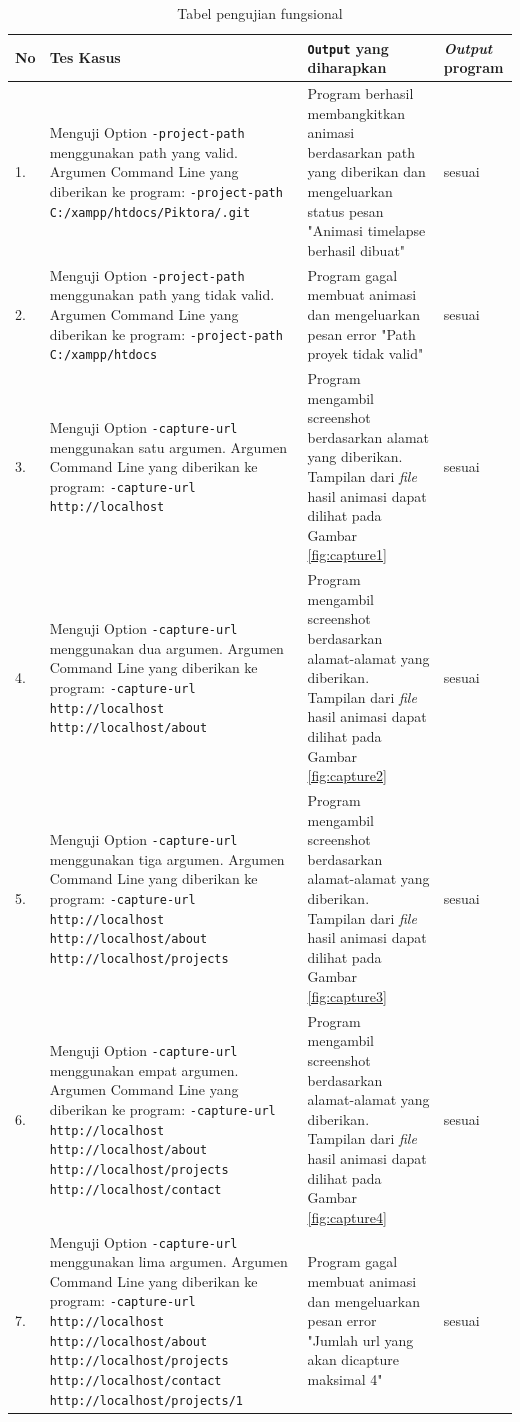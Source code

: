 \begin{table}[htbp]
	\centering
	\caption{Tabel pengujian fungsional}
	
		\begin{tabular}{|p{0.3cm}|>{\raggedright} p{5.5 cm}| p{7 cm}| p{3 cm}|} \hline
		No & Tes Kasus	& \texttt{Output} yang diharapkan & \textit{Output} program \\ \hline
		1. & Menguji Option \texttt{-project-path} menggunakan path yang valid. Argumen Command Line yang diberikan ke program: \texttt{-project-path C:/xampp/htdocs/Piktora/.git} & Program berhasil membangkitkan animasi berdasarkan path yang diberikan dan mengeluarkan status pesan "Animasi timelapse berhasil dibuat" & sesuai \\ \hline
		2. & Menguji Option \texttt{-project-path} menggunakan path yang tidak valid. Argumen Command Line yang diberikan ke program: \texttt{-project-path C:/xampp/htdocs}  & Program gagal membuat animasi dan mengeluarkan pesan error "Path proyek tidak valid"  & sesuai \\ \hline
		3. & Menguji Option \texttt{-capture-url} menggunakan satu argumen. Argumen Command Line yang diberikan ke program:  \texttt{-capture-url http://localhost} & Program mengambil screenshot berdasarkan alamat yang diberikan. Tampilan dari \textit{file} hasil animasi dapat dilihat pada Gambar \ref{fig:capture1}  & sesuai	\\ \hline
		4. & Menguji Option \texttt{-capture-url} menggunakan dua argumen. Argumen Command Line yang diberikan ke program:  \texttt{-capture-url http://localhost http://localhost/about} & Program mengambil screenshot berdasarkan alamat-alamat yang diberikan. Tampilan dari \textit{file} hasil animasi dapat dilihat pada Gambar \ref{fig:capture2}  & sesuai \\ \hline
		5. & Menguji Option \texttt{-capture-url} menggunakan tiga argumen. Argumen Command Line yang diberikan ke program:  \texttt{-capture-url http://localhost http://localhost/about http://localhost/projects} & Program mengambil screenshot berdasarkan alamat-alamat yang diberikan. Tampilan dari \textit{file} hasil animasi dapat dilihat pada Gambar \ref{fig:capture3}   & sesuai\\ \hline
		6. & Menguji Option \texttt{-capture-url} menggunakan empat argumen. Argumen Command Line yang diberikan ke program:  \texttt{-capture-url http://localhost http://localhost/about http://localhost/projects http://localhost/contact} & Program mengambil screenshot berdasarkan alamat-alamat yang diberikan. Tampilan dari \textit{file} hasil animasi dapat dilihat pada Gambar \ref{fig:capture4}  & sesuai \\ \hline
		7. & Menguji Option \texttt{-capture-url} menggunakan lima argumen. Argumen Command Line yang diberikan ke program:  \texttt{-capture-url http://localhost http://localhost/about http://localhost/projects http://localhost/contact http://localhost/projects/1}& Program gagal membuat animasi dan mengeluarkan pesan error "Jumlah url yang akan dicapture maksimal 4" & sesuai \\ \hline
		

\end{tabular}
\end{table}
